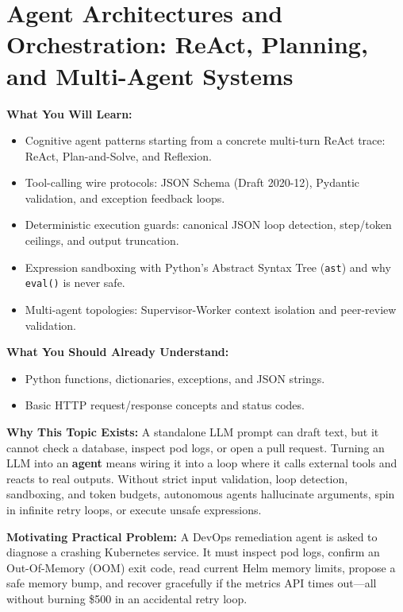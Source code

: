\chapter{Agent Architectures and Orchestration: ReAct, Planning, and Multi-Agent Systems}
\label{chap:agents}

\begin{chaptergoalsbox}
\textbf{What You Will Learn:}
\begin{itemize}[leftmargin=15pt]
  \item Cognitive agent patterns starting from a concrete multi-turn ReAct trace: ReAct, Plan-and-Solve, and Reflexion.
  \item Tool-calling wire protocols: JSON Schema (Draft 2020-12), Pydantic validation, and exception feedback loops.
  \item Deterministic execution guards: canonical JSON loop detection, step/token ceilings, and output truncation.
  \item Expression sandboxing with Python's Abstract Syntax Tree (\texttt{ast}) and why \texttt{eval()} is never safe.
  \item Multi-agent topologies: Supervisor-Worker context isolation and peer-review validation.
\end{itemize}

\textbf{What You Should Already Understand:}
\begin{itemize}[leftmargin=15pt]
  \item Python functions, dictionaries, exceptions, and JSON strings.
  \item Basic HTTP request/response concepts and status codes.
\end{itemize}

\textbf{Why This Topic Exists:}
A standalone LLM prompt can draft text, but it cannot check a database, inspect pod logs, or open a pull request. Turning an LLM into an \textbf{agent} means wiring it into a loop where it calls external tools and reacts to real outputs. Without strict input validation, loop detection, sandboxing, and token budgets, autonomous agents hallucinate arguments, spin in infinite retry loops, or execute unsafe expressions.

\textbf{Motivating Practical Problem:}
A DevOps remediation agent is asked to diagnose a crashing Kubernetes service. It must inspect pod logs, confirm an Out-Of-Memory (OOM) exit code, read current Helm memory limits, propose a safe memory bump, and recover gracefully if the metrics API times out---all without burning \$500 in an accidental retry loop.
\end{chaptergoalsbox}

